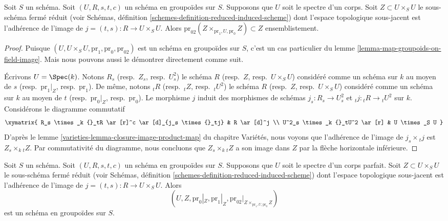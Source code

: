 \begin{lemma}
\label{lemma-groupoid-on-field-image}
Soit $S$ un schéma. Soit $(U, R, s, t, c)$ un schéma en groupoïdes
sur $S$. Supposons que $U$ soit le spectre d'un corps.
Soit $Z \subset U \times_S U$ le sous-schéma fermé réduit (voir
Schémas, définition \ref{schemes-definition-reduced-induced-scheme})
dont l'espace topologique sous-jacent est l'adhérence de l'image de
$j = (t, s) : R \to U \times_S U$. Alors
$\text{pr}_{02}(Z \times_{\text{pr}_1, U, \text{pr}_0} Z) \subset Z$
ensemblistement.
\end{lemma}

\begin{proof}
Puisque $(U, U \times_S U, \text{pr}_1, \text{pr}_0, \text{pr}_{02})$
est un schéma en groupoïdes sur $S$, c'est un cas particulier du
lemme \ref{lemma-map-groupoids-on-field-image}.
Mais nous pouvons aussi le démontrer directement comme suit.

\medskip\noindent
Écrivons $U = \Spec(k)$. Notons
$R_s$ (resp.\ $Z_s$, resp.\ $U^2_s$) le schéma
$R$ (resp.\ $Z$, resp.\ $U \times_S U$) considéré comme un schéma sur $k$ au moyen de
$s$ (resp.\ $\text{pr}_1|_Z$, resp.\ $\text{pr}_1$).
De même, notons
${}_tR$ (resp.\ ${}_tZ$, resp.\ ${}_tU^2$) le schéma
$R$ (resp.\ $Z$, resp.\ $U \times_S U$) considéré comme un schéma sur $k$ au moyen de
$t$ (resp.\ $\text{pr}_0|_Z$, resp.\ $\text{pr}_0$).
Le morphisme $j$ induit des morphismes de schémas
$j_s : R_s \to U^2_s$ et ${}_tj : {}_tR \to {}_tU^2$ sur $k$.
Considérons le diagramme commutatif
$$
\xymatrix{
R_s \times_k {}_tR \ar[r]^c \ar[d]_{j_s \times {}_tj} &  R \ar[d]^j \\
U^2_s \times_k {}_tU^2 \ar[r] & U \times_S U
}
$$
D'après le
lemme \ref{varieties-lemma-closure-image-product-map} du chapitre Variétés,
nous voyons que l'adhérence de l'image de $j_s \times {}_tj$ est
$Z_s \times_k {}_tZ$. Par commutativité du diagramme, nous
concluons que $Z_s \times_k {}_tZ$ a son image dans $Z$ par la flèche
horizontale inférieure.
\end{proof}

\begin{lemma}
\label{lemma-groupoid-on-perfect-field-image}
Soit $S$ un schéma. Soit $(U, R, s, t, c)$ un schéma en groupoïdes
sur $S$. Supposons que $U$ soit le spectre d'un corps parfait.
Soit $Z \subset U \times_S U$ le sous-schéma fermé réduit (voir
Schémas, définition \ref{schemes-definition-reduced-induced-scheme})
dont l'espace topologique sous-jacent est l'adhérence de l'image de
$j = (t, s) : R \to U \times_S U$.
Alors
$$
(U, Z, \text{pr}_0|_Z, \text{pr}_1|_Z,
\text{pr}_{02}|_{Z \times_{\text{pr}_1, U, \text{pr}_0} Z})
$$
est un schéma en groupoïdes sur $S$.
\end{lemma}

